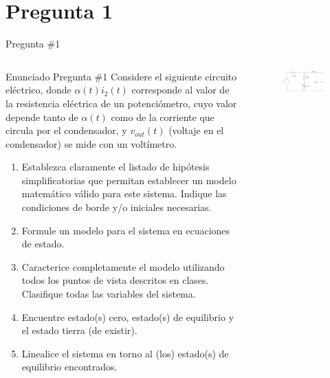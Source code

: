 \documentclass[
    10pt,
    aspectratio=169,
    xcolor={dvipsnames},
    spanish,
    ]{beamer}
\begin{document}
\section{Pregunta 1}
\begin{frame}{Pregunta \#1}
\begin{columns}
  \begin{column}{0.6\textwidth}
    \begin{block}{Enunciado Pregunta \#1}
    \footnotesize
    Considere el siguiente circuito eléctrico, donde \(\alpha(t)i_2(t)\) corresponde al valor de la resistencia eléctrica de un potenciómetro, cuyo valor depende tanto de \(\alpha(t)\) como de la corriente que circula por el condensador, y \(v_{out}(t)\) (voltaje en el condensador) se mide con un voltímetro.
    
    \begin{enumerate}
        \item Establezca claramente el listado de hipótesis simplificatorias que permitan
        establecer un modelo matemático válido para este sistema. Indique las condiciones de borde y/o
        iniciales necesarias.
        \item Formule un modelo para el sistema en ecuaciones de estado.
        \item Caracterice completamente el modelo utilizando todos los puntos de vista descritos en clases.
        Clasifique todas las variables del sistema.
        \item Encuentre estado(s) cero, estado(s) de equilibrio y el estado tierra (de existir).
        \item Linealice el sistema en torno al (los) estado(s) de equilibrio encontrados.
    \end{enumerate}
    \end{block}
  \end{column}
  
  \begin{column}{0.4\textwidth}
    \begin{figure}[ht]
        \centering
        \includegraphics[width=\textwidth]{Auxiliar_2_1.png}
    \end{figure}
  \end{column}
\end{columns}
\end{frame}
\end{document}
